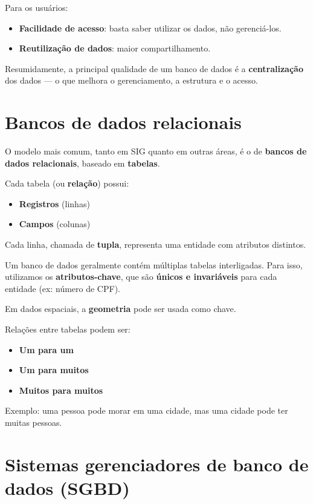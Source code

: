 Para os usuários:

\begin{itemize}
	\item \textbf{Facilidade de acesso}: basta saber utilizar os dados, não gerenciá-los.
	\item \textbf{Reutilização de dados}: maior compartilhamento.
\end{itemize}

Resumidamente, a principal qualidade de um banco de dados é a \textbf{centralização} dos dados — o que melhora o gerenciamento, a estrutura e o acesso.

\section{Bancos de dados relacionais}

O modelo mais comum, tanto em SIG quanto em outras áreas, é o de \textbf{bancos de dados relacionais}, baseado em \textbf{tabelas}.

Cada tabela (ou \textbf{relação}) possui:

\begin{itemize}
 \item \textbf{Registros} (linhas)
 \item \textbf{Campos} (colunas)
\end{itemize}

Cada linha, chamada de \textbf{tupla}, representa uma entidade com atributos distintos.

Um banco de dados geralmente contém múltiplas tabelas interligadas. Para isso, utilizamos os \textbf{atributos-chave}, que são \textbf{únicos e invariáveis} para cada entidade (ex: número de CPF).

Em dados espaciais, a \textbf{geometria} pode ser usada como chave.

Relações entre tabelas podem ser:

\begin{itemize}
 \item \textbf{Um para um}
 \item \textbf{Um para muitos}
 \item \textbf{Muitos para muitos}
\end{itemize}

Exemplo: uma pessoa pode morar em uma cidade, mas uma cidade pode ter muitas pessoas.

\section{Sistemas gerenciadores de banco de dados (SGBD)}

